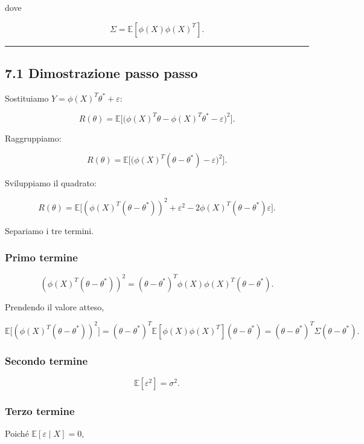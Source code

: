 \documentclass[
]{article}
\begin{document}
dove

\[
\Sigma=\mathbb{E}[\phi(X)\phi(X)^T].
\]

\begin{center}\rule{0.5\linewidth}{0.5pt}\end{center}

\subsection{7.1 Dimostrazione passo
passo}\label{dimostrazione-passo-passo-2}

Sostituiamo \(Y=\phi(X)^T\theta^*+\varepsilon\):

\[
R(\theta)
=
\mathbb{E}\Big[
\big(\phi(X)^T\theta - \phi(X)^T\theta^* - \varepsilon\big)^2
\Big].
\]

Raggruppiamo:

\[
R(\theta)
=
\mathbb{E}\Big[
\big(\phi(X)^T(\theta-\theta^*)-\varepsilon\big)^2
\Big].
\]

Sviluppiamo il quadrato:

\[
R(\theta)
=
\mathbb{E}\Big[
(\phi(X)^T(\theta-\theta^*))^2
+ \varepsilon^2
-2\phi(X)^T(\theta-\theta^*)\varepsilon
\Big].
\]

Separiamo i tre termini.

\subsubsection{Primo termine}\label{primo-termine}

\[
(\phi(X)^T(\theta-\theta^*))^2
=
(\theta-\theta^*)^T\phi(X)\phi(X)^T(\theta-\theta^*).
\]

Prendendo il valore atteso,

\[
\mathbb{E}\big[(\phi(X)^T(\theta-\theta^*))^2\big]
=
(\theta-\theta^*)^T
\mathbb{E}[\phi(X)\phi(X)^T]
(\theta-\theta^*)
=
(\theta-\theta^*)^T\Sigma(\theta-\theta^*).
\]

\subsubsection{Secondo termine}\label{secondo-termine}

\[
\mathbb{E}[\varepsilon^2]=\sigma^2.
\]

\subsubsection{Terzo termine}\label{terzo-termine}

Poiché \(\mathbb{E}[\varepsilon\mid X]=0\),
\end{document}

